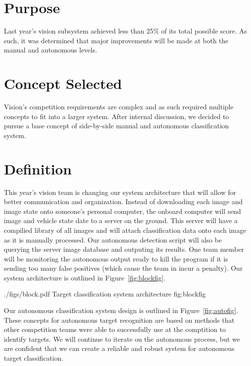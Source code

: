 \documentclass[]{auvsi_doc}
\begin{document}
\begin{AUVSITitlePage}
\begin{artifacttable}
\end{artifacttable}
\end{AUVSITitlePage}

\section{Purpose}

Last year's vision subsystem achieved less than 25\% of its total possible score. As such, 
it was determined that major improvements will be made at both the manual and autonomous 
levels.

\section{Concept Selected}

Vision's competition requirements are complex and as such required multiple concepts to 
fit into a larger system. After internal discussion, we decided to pursue a base concept 
of side-by-side manual and autonomous classification system.

\section{Definition}

This year's vision team is changing our system architecture that will allow for better
communication and organization. Instead of downloading each image and image state
onto someone's personal computer, the onboard computer will send image and vehicle state
date to a server on the ground. This server will have a compilied library of all images
and will attach classification data onto each image as it is manually processed. Our 
autonomous detection script will also be querying the server image database and outputing
its results. One team member will be monitoring the autonomous output ready to kill the 
program if it is sending too many false positives (which cause the team in incur a 
penalty). Our system architecture is outlined in Figure~\ref{fig:blockfig}.

\AUVSIFigure
{./figs/block.pdf}
{\textwidth}
{Target classification system architecture}
{fig:blockfig}

Our autonomous classification system design is outlined in Figure~\ref{fig:autofig}.
These concepts for autonomous target recognition are based on methods that
other competition teams were able to successfully use at the comptition to
identify targets. We will continue to iterate on the autonomous process, but
we are confident that we can create a reliable and robust system for autonomous
target classification.
\end{document}
